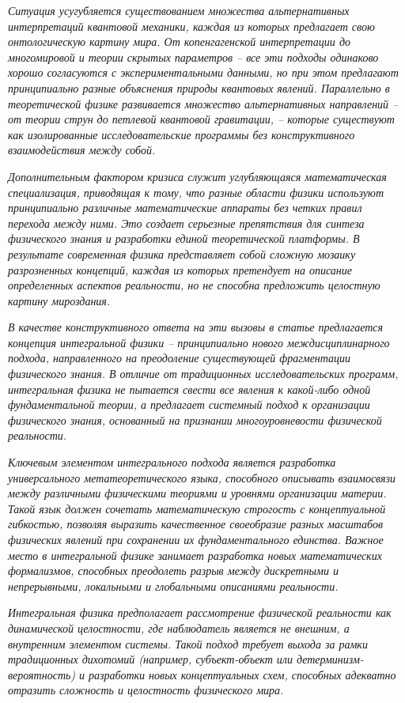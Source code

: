     \textit{Ситуация усугубляется существованием множества альтернативных интерпретаций квантовой механики, каждая из которых предлагает свою онтологическую картину мира. От копенгагенской интерпретации до многомировой и теории скрытых параметров – все эти подходы одинаково хорошо согласуются с экспериментальными данными, но при этом предлагают принципиально разные объяснения природы квантовых явлений. Параллельно в теоретической физике развивается множество альтернативных направлений – от теории струн до петлевой квантовой гравитации, – которые существуют как изолированные исследовательские программы без конструктивного взаимодействия между собой.}

    \textit{Дополнительным фактором кризиса служит углубляющаяся математическая специализация, приводящая к тому, что разные области физики используют принципиально различные математические аппараты без четких правил перехода между ними. Это создает серьезные препятствия для синтеза физического знания и разработки единой теоретической платформы. В результате современная физика представляет собой сложную мозаику разрозненных концепций, каждая из которых претендует на описание определенных аспектов реальности, но не способна предложить целостную картину мироздания.}

    \textit{В качестве конструктивного ответа на эти вызовы в статье предлагается концепция интегральной физики – принципиально нового междисциплинарного подхода, направленного на преодоление существующей фрагментации физического знания. В отличие от традиционных исследовательских программ, интегральная физика не пытается свести все явления к какой-либо одной фундаментальной теории, а предлагает системный подход к организации физического знания, основанный на признании многоуровневости физической реальности.}

    \textit{Ключевым элементом интегрального подхода является разработка универсального метатеоретического языка, способного описывать взаимосвязи между различными физическими теориями и уровнями организации материи. Такой язык должен сочетать математическую строгость с концептуальной гибкостью, позволяя выразить качественное своеобразие разных масштабов физических явлений при сохранении их фундаментального единства. Важное место в интегральной физике занимает разработка новых математических формализмов, способных преодолеть разрыв между дискретными и непрерывными, локальными и глобальными описаниями реальности.}

    \textit{Интегральная физика предполагает рассмотрение физической реальности как динамической целостности, где наблюдатель является не внешним, а внутренним элементом системы. Такой подход требует выхода за рамки традиционных дихотомий (например, субъект-объект или детерминизм-вероятность) и разработки новых концептуальных схем, способных адекватно отразить сложность и целостность физического мира.}

